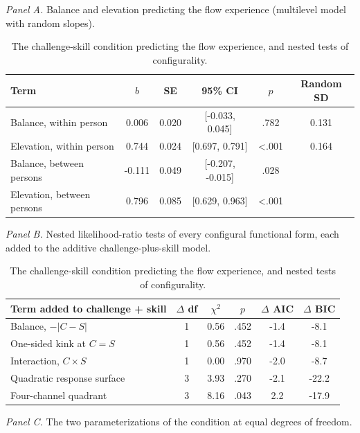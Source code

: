 \begin{table}[!htbp]
\raggedright
\caption{The challenge-skill condition predicting the flow experience, and nested tests of configurality.}
\label{tab:condition}
\footnotesize
\begingroup
\setlength{\tabcolsep}{4pt}
\renewcommand{\arraystretch}{1.08}
\noindent\textit{Panel A.} Balance and elevation predicting the flow experience (multilevel model with random slopes).\par\vspace{2pt}
\begin{tabular*}{\textwidth}{@{\extracolsep{\fill}}lccccc@{}}
\toprule
Term & $b$ & SE & 95\% CI & $p$ & Random SD \\
\midrule
Balance, within person & 0.006 & 0.020 & [-0.033, 0.045] & .782 & 0.131 \\
Elevation, within person & 0.744 & 0.024 & [0.697, 0.791] & <.001 & 0.164 \\
Balance, between persons & -0.111 & 0.049 & [-0.207, -0.015] & .028 &  \\
Elevation, between persons & 0.796 & 0.085 & [0.629, 0.963] & <.001 &  \\
\bottomrule
\end{tabular*}
\par\vspace{6pt}\noindent\textit{Panel B.} Nested likelihood-ratio tests of every configural functional form, each added to the additive challenge-plus-skill model.\par\vspace{2pt}
\begin{tabular*}{\textwidth}{@{\extracolsep{\fill}}lccccc@{}}
\toprule
Term added to challenge + skill & $\Delta$ df & $\chi^2$ & $p$ & $\Delta$ AIC & $\Delta$ BIC \\
\midrule
Balance, $-|C-S|$ & 1 & 0.56 & .452 & -1.4 & -8.1 \\
One-sided kink at $C=S$ & 1 & 0.56 & .452 & -1.4 & -8.1 \\
Interaction, $C \times S$ & 1 & 0.00 & .970 & -2.0 & -8.7 \\
Quadratic response surface & 3 & 3.93 & .270 & -2.1 & -22.2 \\
Four-channel quadrant & 3 & 8.16 & .043 & 2.2 & -17.9 \\
\bottomrule
\end{tabular*}
\par\vspace{6pt}\noindent\textit{Panel C.} The two parameterizations of the condition at equal degrees of freedom.\par\vspace{2pt}

\end{table}
